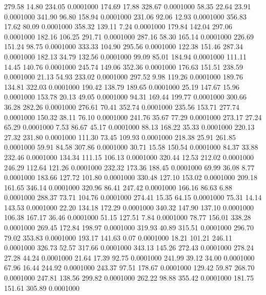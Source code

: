  279.58   14.80  234.05   0.0001000
 174.69   17.88  328.67   0.0001000
  58.35   22.64   23.91   0.0001000
 341.90   96.80  158.94   0.0001000
 231.06   92.06   12.93   0.0001000
 356.83   17.62   80.09   0.0001000
 358.32  139.11    7.24   0.0001000
 179.84  142.04  297.06   0.0001000
 182.16  106.25  291.71   0.0001000
 287.16   58.30  165.14   0.0001000
 226.69  151.24   98.75   0.0001000
 333.33  104.90  295.56   0.0001000
 122.38  151.46  287.34   0.0001000
 182.13   34.79  132.56   0.0001000
  99.09   85.01  184.94   0.0001000
 111.11   14.45  140.76   0.0001000
 245.74  149.06  352.36   0.0001000
 176.63  151.51  238.59   0.0001000
  21.13   54.93  233.02   0.0001000
 297.52    9.98  119.26   0.0001000
 189.76  134.81  322.03   0.0001000
 190.42  138.79  189.65   0.0001000
  25.19  147.67   15.96   0.0001000
 153.78   20.13   49.05   0.0001000
  94.31  169.44  199.77   0.0001000
 300.66   36.28  282.26   0.0001000
 276.61   70.41  352.74   0.0001000
 235.56  153.71  277.74   0.0001000
 150.32   38.11   76.10   0.0001000
 241.76   35.67   77.29   0.0001000
 273.17   27.24   65.29   0.0001000
   7.53   86.67   45.17   0.0001000
  88.13  168.22   35.33   0.0001000
 220.13   27.32  231.80   0.0001000
 111.30   73.45  109.93   0.0001000
 218.38   25.91  261.85   0.0001000
  59.91   84.58  307.86   0.0001000
  30.71   15.58  150.54   0.0001000
  84.37   33.88  232.46   0.0001000
 134.34  111.15  106.13   0.0001000
 320.44   12.53  212.02   0.0001000
 246.29  112.64  121.26   0.0001000
 232.32  173.36  188.45   0.0001000
  69.99   36.08    8.77   0.0001000
 183.66  127.72  101.80   0.0001000
 330.48  127.10  153.02   0.0001000
 209.18  161.65  346.14   0.0001000
 320.96   86.41  247.42   0.0001000
 166.16   86.63    6.88   0.0001000
 288.37   73.71  104.76   0.0001000
 274.41   15.35   64.15   0.0001000
  75.31   14.14  143.53   0.0001000
  22.20  134.18  172.29   0.0001000
 340.32  147.90  137.10   0.0001000
 106.38  167.17   36.46   0.0001000
  51.15  127.51    7.84   0.0001000
  78.77  156.01  338.28   0.0001000
 269.45  172.84  198.97   0.0001000
 319.93   40.89  315.51   0.0001000
 296.70   79.02  353.83   0.0001000
 193.17  141.63    0.07   0.0001000
  18.21  101.21  246.11   0.0001000
 326.73   52.57  317.66   0.0001000
 343.13  145.26  272.43   0.0001000
 278.24   27.28   44.24   0.0001000
  21.64   17.39   92.75   0.0001000
 241.99   39.12   34.00   0.0001000
  67.96   16.44  244.92   0.0001000
 243.37   97.51  178.67   0.0001000
 129.42   59.87  268.70   0.0001000
 247.81  138.56  299.82   0.0001000
 262.22   98.88  355.42   0.0001000
 181.75  151.61  305.89   0.0001000
